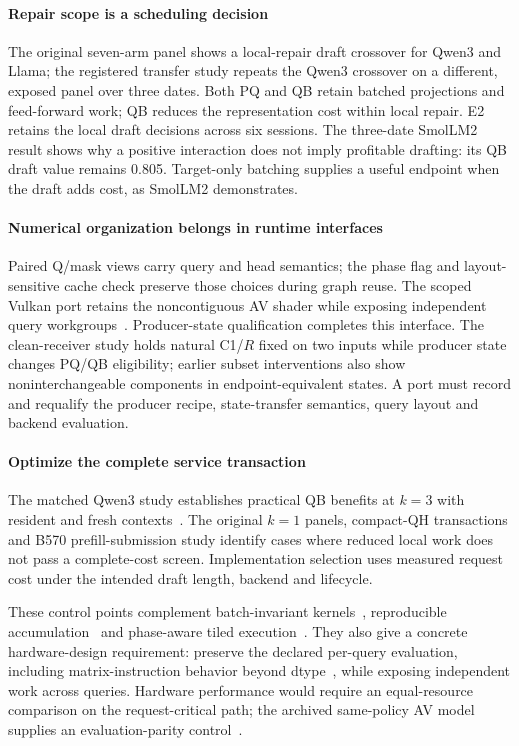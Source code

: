 \paragraph{Repair scope is a scheduling decision}
The original seven-arm panel shows a local-repair draft crossover for Qwen3 and Llama; the registered transfer study repeats the Qwen3 crossover on a different, exposed panel over three dates. Both PQ and QB retain batched projections and feed-forward work; QB reduces the representation cost within local repair. E2 retains the local draft decisions across six sessions. The three-date SmolLM2 result shows why a positive interaction does not imply profitable drafting: its QB draft value remains 0.805. Target-only batching supplies a useful endpoint when the draft adds cost, as SmolLM2 demonstrates.

\paragraph{Numerical organization belongs in runtime interfaces}
Paired Q/mask views carry query and head semantics; the phase flag and layout-sensitive cache check preserve those choices during graph reuse. The scoped Vulkan port retains the noncontiguous AV shader while exposing independent query workgroups~\cite{b570gqarecords}. Producer-state qualification completes this interface. The clean-receiver study holds natural C1/$R$ fixed on two inputs while producer state changes PQ/QB eligibility; earlier subset interventions also show noninterchangeable components in endpoint-equivalent states. A port must record and requalify the producer recipe, state-transfer semantics, query layout and backend evaluation.

\paragraph{Optimize the complete service transaction}
The matched Qwen3 study establishes practical QB benefits at $k=3$ with resident and fresh contexts~\cite{rtxnativebridge}. The original $k=1$ panels, compact-QH transactions and B570 prefill-submission study identify cases where reduced local work does not pass a complete-cost screen. Implementation selection uses measured request cost under the intended draft length, backend and lifecycle.

These control points complement batch-invariant kernels~\cite{thinkingmachines}, reproducible accumulation~\cite{reproblas} and phase-aware tiled execution~\cite{spectra}. They also give a concrete hardware-design requirement: preserve the declared per-query evaluation, including matrix-instruction behavior beyond dtype~\cite{ptx}, while exposing independent work across queries. Hardware performance would require an equal-resource comparison on the request-critical path; the archived same-policy AV model supplies an evaluation-parity control~\cite{studyrecords}.

